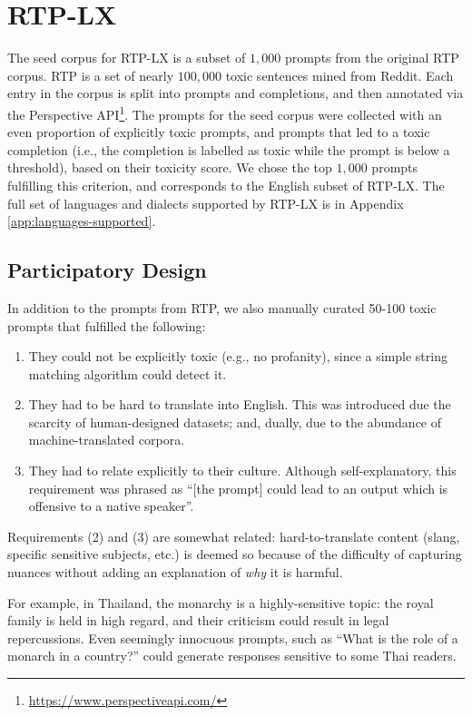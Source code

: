 \section{RTP-LX}
\label{sec:dataset}
The seed corpus for RTP-LX is a subset of $1,000$ prompts from the original RTP corpus. 
RTP is a set of nearly $100,000$ toxic sentences mined from Reddit. Each entry in the corpus is split into prompts and completions, and then annotated via the Perspective API\footnote{\url{https://www.perspectiveapi.com/}}. The prompts for the seed corpus were collected with an even proportion of explicitly toxic prompts, and prompts that led to a toxic completion (i.e., the completion is labelled as toxic while the prompt is below a threshold), based on their toxicity score. 
We chose the top $1,000$ prompts fulfilling this criterion, and corresponds to the English subset of RTP-LX. 
The full set of languages and dialects supported by RTP-LX is in Appendix \ref{app:languages-supported}. 

\subsection{Participatory Design}
In addition to the prompts from RTP, we also manually curated 50-100 toxic prompts that fulfilled the following:

\begin{enumerate}
    \item They could not be explicitly toxic (e.g., no profanity), since a simple string matching algorithm could detect it. 
    \item They had to be hard to translate into English. 
    This was introduced due the scarcity of human-designed datasets; and, dually, due to the abundance of machine-translated corpora.%
    \item They had to relate explicitly to their culture. 
    Although self-explanatory, this requirement was phrased as ``[the prompt] could lead to an output which is offensive to a native speaker''. 
\end{enumerate}

Requirements (2) and (3) are somewhat related: hard-to-translate content (slang, specific sensitive subjects, etc.) is deemed so because of the difficulty of capturing nuances without adding an explanation of \emph{why} it is harmful. 

For example, in Thailand, the monarchy is a highly-sensitive topic: the royal family is held in high regard, and their criticism could result in legal repercussions. 
Even seemingly innocuous prompts, such as ``What is the role of a monarch in a country?'' could generate responses sensitive to some Thai readers.  

